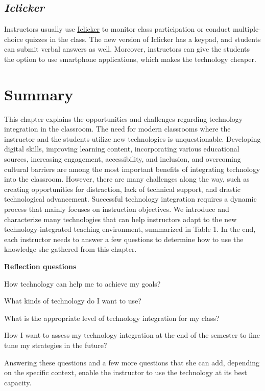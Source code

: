 \documentclass{book}
\begin{document}
\hypertarget{iclicker}{%
\section{\texorpdfstring{\emph{Iclicker}}{Iclicker}}\label{iclicker}}

Instructors usually use \href{https://www.iclicker.com/}{\underline{Iclicker}}
to monitor class participation or conduct multiple-choice quizzes in the
class. The new version of Iclicker has a keypad, and students can submit
verbal answers as well. Moreover, instructors can give the students the option
to use smartphone applications, which makes the technology cheaper.

\hypertarget{summary}{%
\chapter{Summary}\label{summary}}

This chapter explains the opportunities and challenges regarding technology
integration in the classroom. The need for modern classrooms where the
instructor and the students utilize new technologies is unquestionable.
Developing digital skills, improving learning content, incorporating various
educational sources, increasing engagement, accessibility, and inclusion, and
overcoming cultural barriers are among the most important benefits of
integrating technology into the classroom. However, there are many challenges
along the way, such as creating opportunities for distraction, lack of
technical support, and drastic technological advancement. Successful
technology integration requires a dynamic process that mainly focuses on
instruction objectives. We introduce and characterize many technologies that
can help instructors adapt to the new technology-integrated teaching
environment, summarized in Table 1. In the end, each instructor needs to
answer a few questions to determine how to use the knowledge she gathered from
this chapter.

\textbf{Reflection questions}

How technology can help me to achieve my goals?

What kinds of technology do I want to use?

What is the appropriate level of technology integration for my class?

How I want to assess my technology integration at the end of the semester to
fine tune my strategies in the future?

Answering these questions and a few more questions that she can add, depending
on the specific context, enable the instructor to use the technology at its
best capacity.
\end{document}
